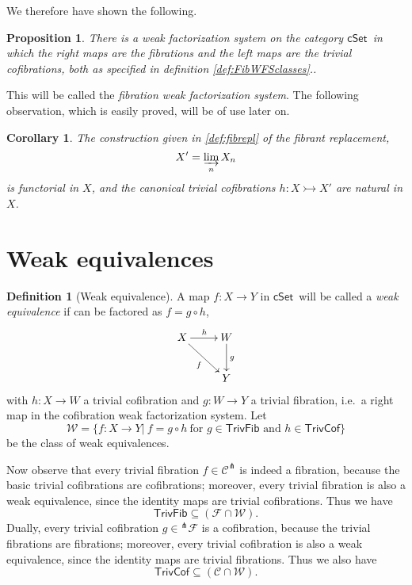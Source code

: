 \documentclass[11pt]{article}
\newcommand{\cSet}{\ensuremath{\mathsf{cSet}}}
\newcommand{\mono}{\ensuremath{\rightarrowtail}}
\newcommand{\ra}{\ensuremath{\rightarrow}}
\newtheorem{proposition}[theorem]{Proposition}
\newtheorem{corollary}[theorem]{Corollary}
\theoremstyle{remark}
\theoremstyle{definition}
\newtheorem{definition}[theorem]{Definition}
\begin{document}
We therefore have shown the following.

\begin{proposition}
There is a weak factorization system on the category \cSet\ in which the right maps are the fibrations and the left maps are the trivial cofibrations, both as specified in definition \ref{def:FibWFSclasses}..
\end{proposition}

This will be called the \emph{fibration weak factorization system}.
The following observation, which is easily proved, will be of use later on.

\begin{corollary}
The  construction given in \eqref{def:fibrepl} of the \emph{fibrant replacement}, $$X' = \varinjlim_n X_n$$ is functorial in $X$, and the canonical trivial cofibrations $h:X\mono X'$ are natural in $X$.
\end{corollary}


\section{Weak equivalences}

\begin{definition}[Weak equivalence]
A map $f: X\to Y$ in \cSet\ will be called a \emph{weak equivalence} if can be factored as $f  = g\circ h$,
\begin{equation*}%
\xymatrix{
X \ar[rd]_{f} \ar[r]^h & W\ar[d]^g\\
& Y
}
\end{equation*}
with $h: X\ra W$ a trivial cofibration and $g: W\ra Y$ a trivial fibration, i.e.\ a right map in the cofibration weak factorization system. Let 
\[
\mathcal{W} = \{f: X\to Y |\ f = g\circ h\ \text{for $g\in\mathsf{TrivFib}$ and $h\in\mathsf{TrivCof}$} \}
\]
 be the class of weak equivalences.
\end{definition}

Now observe that every trivial fibration $f\in\mathcal{C}^\pitchfork$ is indeed a fibration, because the basic trivial cofibrations are cofibrations; moreover, every trivial fibration is also a weak equivalence, since the identity maps are trivial cofibrations.  Thus we have
\[
\mathsf{TrivFib} \subseteq (\mathcal{F} \cap \mathcal{W}).
\]
Dually, every trivial cofibration $g\in{^{\pitchfork}\mathcal{F}}$ is a cofibration, because the trivial fibrations are fibrations; moreover, every trivial cofibration is also a weak equivalence, since the identity maps are trivial fibrations.  Thus we also have
\[
\mathsf{TrivCof} \subseteq (\mathcal{C} \cap \mathcal{W}).
\]
\end{document}
